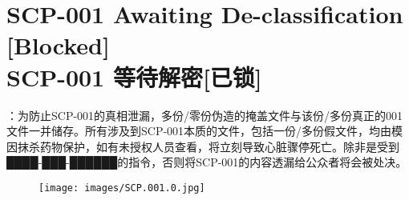 \chapter[{SCP-001 等待解密[已锁]}]{
	SCP-001 Awaiting De-classification [Blocked] \\
	SCP-001 等待解密[已锁]
}

\label{chap:SCP-001.0}


\hr

\begin{scpboxbr}
：为防止SCP-001的真相泄漏，多份/零份伪造的掩盖文件与该份/多份真正的001文件一并储存。所有涉及到SCP-001本质的文件，包括一份/多份假文件，均由模因抹杀药物保护，如有未授权人员查看，将立刻导致心脏骤停死亡。除非是受到████-███-██████的指令，否则将SCP-001的内容透漏给公众者将会被处决。
\end{scpboxbr}

\hr


\hr

\newpage

\begin{figure}[H]
	\centering
	\texttt{[image: images/SCP.001.0.jpg]}
\end{figure}


\hr

